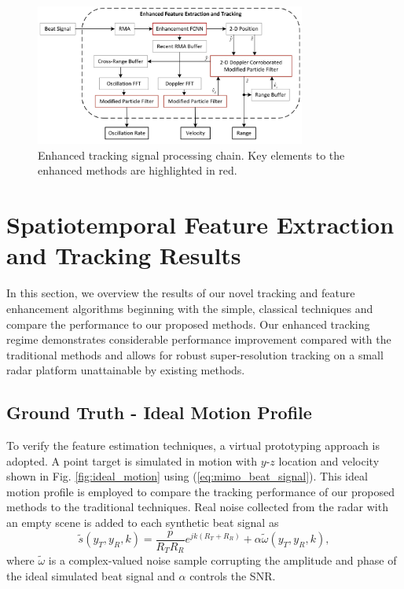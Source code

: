 \documentclass[10pt,journal,final]{IEEEtran}
\begin{document}
\begin{figure}[h]
	\centering
	\includegraphics[width=3.5in]{enhanced_RMI.jpg}
	\caption{Enhanced tracking signal processing chain. Key elements to the enhanced methods are highlighted in red.}
	\label{fig:enhanced_signal_chain}
\end{figure}

\section{Spatiotemporal Feature Extraction and Tracking Results}
\label{sec:results}

In this section, we overview the results of our novel tracking and feature enhancement algorithms beginning with the simple, classical techniques and compare the performance to our proposed methods.
Our enhanced tracking regime demonstrates considerable performance improvement compared with the traditional methods and allows for robust super-resolution tracking on a small radar platform unattainable by existing methods.

\subsection{Ground Truth - Ideal Motion Profile}
\label{subsec:ideal_motion_profile}

To verify the feature estimation techniques, a virtual prototyping approach is adopted. A point target is simulated in motion with $y$-$z$ location and velocity shown in Fig. \ref{fig:ideal_motion} using (\ref{eq:mimo_beat_signal}). 
This ideal motion profile is employed to compare the tracking performance of our proposed methods to the traditional techniques. 
Real noise collected from the radar with an empty scene is added to each synthetic beat signal as
\begin{equation}
\label{eq:beat_sim_with_noise}
	\tilde{s}(y_T,y_R,k) = \frac{p}{R_T R_R}e^{jk(R_T + R_R)} + \alpha \tilde{ \omega}(y_T,y_R,k),
\end{equation}
where $\tilde{ \omega}$ is a complex-valued noise sample corrupting the amplitude and phase of the ideal simulated beat signal and $\alpha$ controls the SNR.
\end{document}
